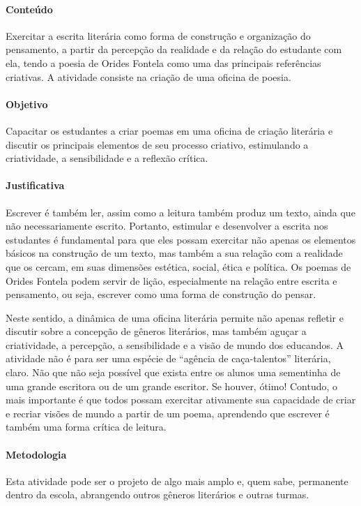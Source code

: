 \documentclass[12pt]{extarticle}
\begin{document}
\paragraph{Conteúdo} Exercitar a escrita literária como forma de
construção e organização do pensamento, a partir da percepção da
realidade e da relação do estudante com ela, tendo a poesia de Orides
Fontela como uma das principais referências criativas. A atividade
consiste na criação de uma oficina de poesia.

\paragraph{Objetivo} Capacitar os estudantes a criar poemas em uma oficina
de criação literária e discutir os principais elementos de seu processo
criativo, estimulando a criatividade, a sensibilidade e a reflexão
crítica.

\paragraph{Justificativa} Escrever é também ler, assim como a leitura
também produz um texto, ainda que não necessariamente escrito. Portanto,
estimular e desenvolver a escrita nos estudantes é fundamental para que
eles possam exercitar não apenas os elementos básicos na construção de
um texto, mas também a sua relação com a realidade que os cercam, em
suas dimensões estética, social, ética e política. Os poemas de Orides
Fontela podem servir de lição, especialmente na relação entre escrita e
pensamento, ou seja, escrever como uma forma de construção do pensar.

Neste sentido, a dinâmica de uma oficina literária permite não apenas
refletir e discutir sobre a concepção de gêneros literários, mas também
aguçar a criatividade, a percepção, a sensibilidade e a visão de mundo
dos educandos. A atividade não é para ser uma espécie de ``agência de
caça-talentos'' literária, claro. Não que não seja possível que exista
entre os alunos uma sementinha de uma grande escritora ou de um grande
escritor. Se houver, ótimo! Contudo, o mais importante é que todos
possam exercitar ativamente sua capacidade de criar e recriar visões de
mundo a partir de um poema, aprendendo que escrever é também uma forma
crítica de leitura.

\paragraph{Metodologia} Esta atividade pode ser o projeto de algo mais
amplo e, quem sabe, permanente dentro da escola, abrangendo outros
gêneros literários e outras turmas.
\end{document}
